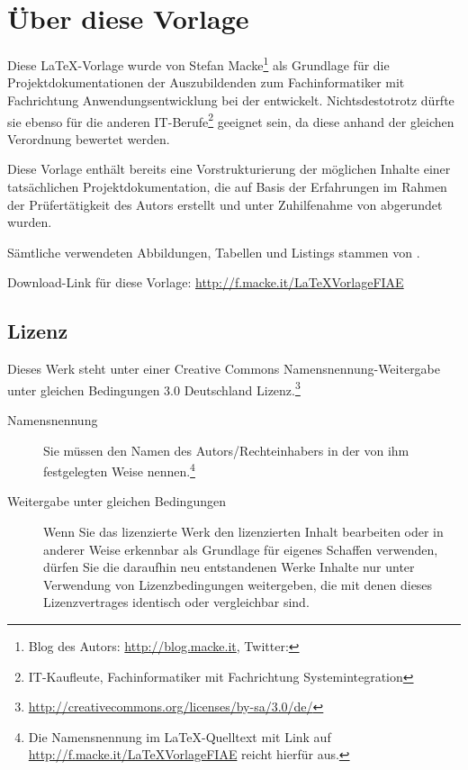 \section*{Über diese Vorlage}

Diese \LaTeX-Vorlage wurde von Stefan Macke\footnote{Blog des Autors: \url{http://blog.macke.it}, Twitter: } 
als Grundlage für die Projektdokumentationen der Auszubildenden zum Fachinformatiker mit Fachrichtung Anwendungsentwicklung 
bei der \AO entwickelt. Nichtsdestotrotz dürfte sie ebenso für die anderen IT-Berufe\footnote{\zB IT-Kaufleute, Fachinformatiker 
mit Fachrichtung Systemintegration \usw} geeignet sein, da diese anhand der gleichen Verordnung bewertet werden.

Diese Vorlage enthält bereits eine Vorstrukturierung der möglichen Inhalte einer tatsächlichen Projektdokumentation, die auf Basis der 
Erfahrungen im Rahmen der Prüfertätigkeit des Autors erstellt und unter Zuhilfenahme von \citet{Rohrer2011} abgerundet wurden.

Sämtliche verwendeten Abbildungen, Tabellen und Listings stammen von \citet{Grashorn2010}.

Download-Link für diese Vorlage: \url{http://f.macke.it/LaTeXVorlageFIAE}

\subsection*{Lizenz}

\begin{center}
\end{center}
Dieses Werk steht unter einer Creative Commons Namensnennung-Weitergabe unter gleichen Bedingungen 3.0 Deutschland Lizenz.\footnote{\url{http://creativecommons.org/licenses/by-sa/3.0/de/}}

\begin{center}
\end{center}

\begin{description}
	\item[Namensnennung] Sie müssen den Namen des Autors/Rechteinhabers in der von ihm festgelegten Weise nennen.\footnote{Die Namensnennung im \LaTeX-Quelltext mit Link auf \url{http://f.macke.it/LaTeXVorlageFIAE} reicht hierfür aus.}
	\item[Weitergabe unter gleichen Bedingungen] Wenn Sie das lizenzierte Werk \bzw den lizenzierten Inhalt bearbeiten 
	oder in anderer Weise erkennbar als Grundlage für eigenes Schaffen verwenden, dürfen Sie die daraufhin neu entstandenen 
	Werke \bzw Inhalte nur unter Verwendung von Lizenzbedingungen weitergeben, die mit denen dieses Lizenzvertrages identisch oder vergleichbar sind. 
\end{description}

